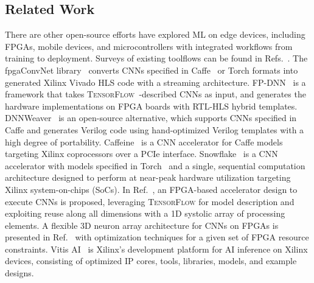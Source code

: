\documentclass[sigconf]{acmart}
\begin{document}

\subsection*{Related Work}

There are other open-source efforts have explored ML on edge devices, including FPGAs, mobile devices, and microcontrollers with integrated workflows from training to deployment.
Surveys of existing toolflows can be found in Refs.~\cite{2018arXiv180305900V,10.1145/3289185,Shawahna_2019,abdelouahab2018accelerating}. 
The fpgaConvNet library~\cite{venieris2017fpgaconvnet,venieris2017fpga,venieris2017fpl,venieris2016fccm} converts CNNs specified in Caffe~\cite{jia2014caffe} or Torch formats into generated Xilinx Vivado HLS code with a streaming architecture. 
FP-DNN~\cite{fpdnn} is a framework that takes \textsc{TensorFlow}~\cite{tensorflow2015-whitepaper}-described CNNs as input, and generates the hardware implementations on FPGA boards with RTL-HLS hybrid templates. 
DNNWeaver~\cite{dnnweaver:micro16} is an open-source alternative, which supports CNNs specified in Caffe and generates Verilog code using hand-optimized Verilog templates with a high degree of portability.
Caffeine~\cite{caffeinatedFPGAs} is a CNN accelerator for Caffe models targeting Xilinx coprocessors over a PCIe interface.
Snowflake~\cite{snowflake} is a CNN accelerator with models specified in Torch~\cite{torch} and a single, sequential computation architecture designed to perform at near-peak hardware utilization targeting Xilinx system-on-chips (SoCs). 
In Ref.~\cite{majumder2019flexible}, an FPGA-based accelerator design to execute CNNs is proposed, leveraging \textsc{TensorFlow} for model description and exploiting reuse along all dimensions with a 1D systolic array of processing elements.
A flexible 3D neuron array architecture for CNNs on FPGAs is presented in Ref.~\cite{7459526} with optimization techniques for a given set of FPGA resource constraints.
Vitis AI~\cite{vitisai} is Xilinx's development platform for AI inference on Xilinx devices, consisting of optimized IP cores, tools, libraries, models, and example designs.
\end{document}
